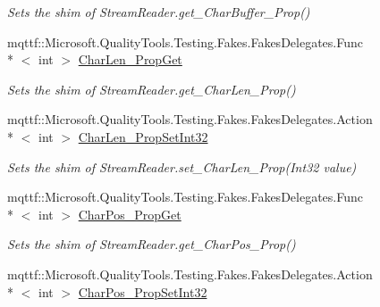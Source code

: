 \begin{DoxyCompactItemize}
\begin{DoxyCompactList}\small\item\em Sets the shim of Stream\-Reader.\-get\-\_\-\-Char\-Buffer\-\_\-\-Prop()\end{DoxyCompactList}\item 
mqttf\-::\-Microsoft.\-Quality\-Tools.\-Testing.\-Fakes.\-Fakes\-Delegates.\-Func\\*
$<$ int $>$ \hyperlink{class_system_1_1_i_o_1_1_fakes_1_1_shim_stream_reader_a7da961135df9dff6861e956c139fd21b}{Char\-Len\-\_\-\-Prop\-Get}
\begin{DoxyCompactList}\small\item\em Sets the shim of Stream\-Reader.\-get\-\_\-\-Char\-Len\-\_\-\-Prop()\end{DoxyCompactList}\item 
mqttf\-::\-Microsoft.\-Quality\-Tools.\-Testing.\-Fakes.\-Fakes\-Delegates.\-Action\\*
$<$ int $>$ \hyperlink{class_system_1_1_i_o_1_1_fakes_1_1_shim_stream_reader_a668b8fcf5ef14a74f1ab7c6ca3b3aceb}{Char\-Len\-\_\-\-Prop\-Set\-Int32}
\begin{DoxyCompactList}\small\item\em Sets the shim of Stream\-Reader.\-set\-\_\-\-Char\-Len\-\_\-\-Prop(\-Int32 value)\end{DoxyCompactList}\item 
mqttf\-::\-Microsoft.\-Quality\-Tools.\-Testing.\-Fakes.\-Fakes\-Delegates.\-Func\\*
$<$ int $>$ \hyperlink{class_system_1_1_i_o_1_1_fakes_1_1_shim_stream_reader_a311bc16265e50fab9ad1efd3dcf7b2e1}{Char\-Pos\-\_\-\-Prop\-Get}
\begin{DoxyCompactList}\small\item\em Sets the shim of Stream\-Reader.\-get\-\_\-\-Char\-Pos\-\_\-\-Prop()\end{DoxyCompactList}\item 
mqttf\-::\-Microsoft.\-Quality\-Tools.\-Testing.\-Fakes.\-Fakes\-Delegates.\-Action\\*
$<$ int $>$ \hyperlink{class_system_1_1_i_o_1_1_fakes_1_1_shim_stream_reader_a7e15352980d785745ec96d3b01be93d5}{Char\-Pos\-\_\-\-Prop\-Set\-Int32}

\end{DoxyCompactItemize}
